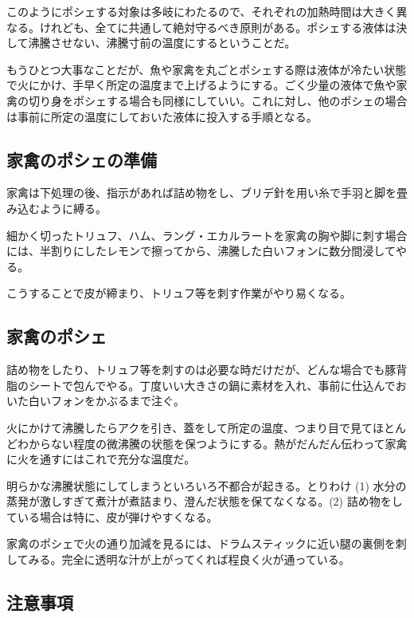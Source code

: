 このようにポシェする対象は多岐にわたるので、それぞれの加熱時間は大きく異なる。けれども、全てに共通して絶対守るべき原則がある。ポシェする液体は決して沸騰させない、沸騰寸前の温度にするということだ。

もうひとつ大事なことだが、魚や家禽を丸ごとポシェする際は液体が冷たい状態で火にかけ、手早く所定の温度まで上げるようにする。ごく少量の液体で魚や家禽の切り身をポシェする場合も同様にしていい。これに対し、他のポシェの場合は事前に所定の温度にしておいた液体に投入する手順となる。

\hypertarget{ux5bb6ux79bdux306eux30ddux30b7ux30a7ux306eux6e96ux5099}{%
\subsection{家禽のポシェの準備}\label{ux5bb6ux79bdux306eux30ddux30b7ux30a7ux306eux6e96ux5099}}

家禽は下処理の後、指示があれば詰め物をし、ブリデ針を用い糸で手羽と脚を畳み込むように縛る。

細かく切ったトリュフ、ハム、ラング・エカルラートを家禽の胸や脚に刺す場合には、半割りにしたレモンで擦ってから、沸騰した白いフォンに数分間浸してやる。

こうすることで皮が締まり、トリュフ等を刺す作業がやり易くなる。

\hypertarget{ux5bb6ux79bdux306eux30ddux30b7ux30a7}{%
\subsection{家禽のポシェ}\label{ux5bb6ux79bdux306eux30ddux30b7ux30a7}}

詰め物をしたり、トリュフ等を刺すのは必要な時だけだが、どんな場合でも豚背脂のシートで包んでやる。丁度いい大きさの鍋に素材を入れ、事前に仕込んでおいた白いフォンをかぶるまで注ぐ。

火にかけて沸騰したらアクを引き、蓋をして所定の温度、つまり目で見てほとんどわからない程度の微沸騰の状態を保つようにする。熱がだんだん伝わって家禽に火を通すにはこれで充分な温度だ。

明らかな沸騰状態にしてしまうといろいろ不都合が起きる。とりわけ (1)
水分の蒸発が激しすぎて煮汁が煮詰まり、澄んだ状態を保てなくなる。(2)
詰め物をしている場合は特に、皮が弾けやすくなる。

家禽のポシェで火の通り加減を見るには、ドラムスティックに近い腿の裏側を刺してみる。完全に透明な汁が上がってくれば程良く火が通っている。

\hypertarget{ux6ce8ux610fux4e8bux9805-1}{%
\subsection{注意事項}\label{ux6ce8ux610fux4e8bux9805-1}}

